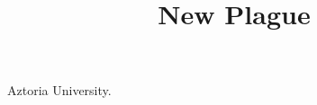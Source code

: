 \documentclass[11pt]{article}
\begin{document}
\ttfamily
\title{New Plague}
\maketitle

Aztoria University.
\end{document}
